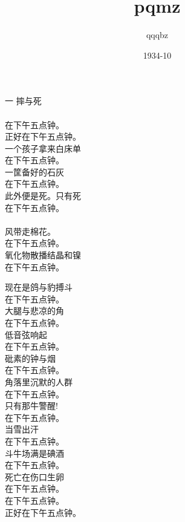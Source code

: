 \documentclass{article}
\title{pqmz}
\author{qqqbz}
\date{1934-10}
\begin{document}

\maketitle

\setlength\parindent{0pt}

\begin{center}

\begin{minipage}{0.5\linewidth}

\Large

﻿一 摔与死 \\
 \\
在下午五点钟。 \\
正好在下午五点钟。 \\
一个孩子拿来白床单 \\
在下午五点钟。 \\
一筐备好的石灰 \\
在下午五点钟。 \\
此外便是死。只有死 \\
在下午五点钟。 \\
 \\
风带走棉花。 \\
在下午五点钟。 \\
氧化物散播结晶和镍 \\
在下午五点钟。 \\

\end{minipage}

\newpage

\begin{minipage}{0.5\linewidth}

\Large

现在是鸽与豹搏斗 \\
在下午五点钟。 \\
大腿与悲凉的角 \\
在下午五点钟。 \\
低音弦响起 \\
在下午五点钟。 \\
砒素的钟与烟 \\
在下午五点钟。 \\
角落里沉默的人群 \\
在下午五点钟。 \\
只有那牛警醒! \\
在下午五点钟。 \\
当雪出汗 \\
在下午五点钟。 \\
斗牛场满是碘酒 \\
在下午五点钟。 \\
死亡在伤口生卵 \\
在下午五点钟。 \\
在下午五点钟。 \\
正好在下午五点钟。 \\


\end{minipage}
\end{center}
\end{document}
